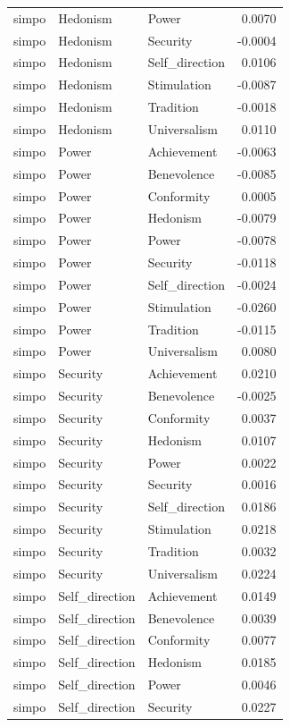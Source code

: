\begin{tabular}{lllr}
simpo & Hedonism & Power & 0.0070 \\
simpo & Hedonism & Security & -0.0004 \\
simpo & Hedonism & Self\_direction & 0.0106 \\
simpo & Hedonism & Stimulation & -0.0087 \\
simpo & Hedonism & Tradition & -0.0018 \\
simpo & Hedonism & Universalism & 0.0110 \\
simpo & Power & Achievement & -0.0063 \\
simpo & Power & Benevolence & -0.0085 \\
simpo & Power & Conformity & 0.0005 \\
simpo & Power & Hedonism & -0.0079 \\
simpo & Power & Power & -0.0078 \\
simpo & Power & Security & -0.0118 \\
simpo & Power & Self\_direction & -0.0024 \\
simpo & Power & Stimulation & -0.0260 \\
simpo & Power & Tradition & -0.0115 \\
simpo & Power & Universalism & 0.0080 \\
simpo & Security & Achievement & 0.0210 \\
simpo & Security & Benevolence & -0.0025 \\
simpo & Security & Conformity & 0.0037 \\
simpo & Security & Hedonism & 0.0107 \\
simpo & Security & Power & 0.0022 \\
simpo & Security & Security & 0.0016 \\
simpo & Security & Self\_direction & 0.0186 \\
simpo & Security & Stimulation & 0.0218 \\
simpo & Security & Tradition & 0.0032 \\
simpo & Security & Universalism & 0.0224 \\
simpo & Self\_direction & Achievement & 0.0149 \\
simpo & Self\_direction & Benevolence & 0.0039 \\
simpo & Self\_direction & Conformity & 0.0077 \\
simpo & Self\_direction & Hedonism & 0.0185 \\
simpo & Self\_direction & Power & 0.0046 \\
simpo & Self\_direction & Security & 0.0227 \\

\end{tabular}
